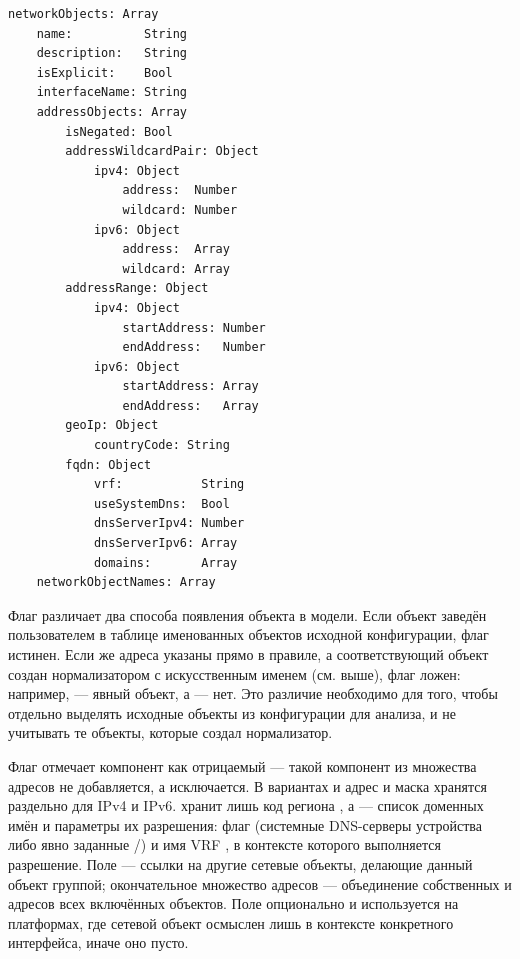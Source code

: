 \begin{lstlisting}[style=schemastyle]
networkObjects: Array
    name:          String
    description:   String
    isExplicit:    Bool
    interfaceName: String
    addressObjects: Array
        isNegated: Bool
        addressWildcardPair: Object
            ipv4: Object
                address:  Number
                wildcard: Number
            ipv6: Object
                address:  Array
                wildcard: Array
        addressRange: Object
            ipv4: Object
                startAddress: Number
                endAddress:   Number
            ipv6: Object
                startAddress: Array
                endAddress:   Array
        geoIp: Object
            countryCode: String
        fqdn: Object
            vrf:           String
            useSystemDns:  Bool
            dnsServerIpv4: Number
            dnsServerIpv6: Array
            domains:       Array
    networkObjectNames: Array
\end{lstlisting}

Флаг  различает два способа появления объекта в модели. Если объект заведён пользователем в таблице именованных объектов исходной конфигурации, флаг истинен. Если же адреса указаны прямо в правиле, а соответствующий объект создан нормализатором с искусственным именем (см. выше), флаг ложен: например,  --- явный объект, а  --- нет.
Это различие необходимо для того, чтобы отдельно выделять исходные объекты из конфигурации для анализа, и не учитывать те объекты, которые создал нормализатор.

Флаг  отмечает компонент как отрицаемый --- такой компонент из множества адресов не добавляется, а исключается. В вариантах  и  адрес и маска хранятся раздельно для IPv4 и IPv6.  хранит лишь код региона , а  --- список доменных имён  и параметры их разрешения: флаг  (системные DNS-серверы устройства либо явно заданные /) и имя VRF , в контексте которого выполняется разрешение. Поле  --- ссылки на другие сетевые объекты, делающие данный объект группой; окончательное множество адресов --- объединение собственных  и адресов всех включённых объектов. Поле  опционально и используется на платформах, где сетевой объект осмыслен лишь в контексте конкретного интерфейса, иначе оно пусто.

